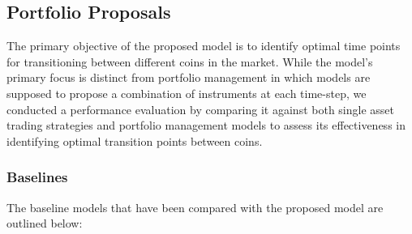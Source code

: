 \subsection{Portfolio Proposals}
The primary objective of the proposed model is to identify optimal time points for transitioning between different coins in the market. While the model's primary focus is distinct from portfolio management in which models are supposed to propose a combination of instruments at each time-step, we conducted a performance evaluation by comparing it against both single asset trading strategies and portfolio management models to assess its effectiveness in identifying optimal transition points between coins.

\subsubsection{Baselines}
The baseline models that have been compared with the proposed model are outlined below:

